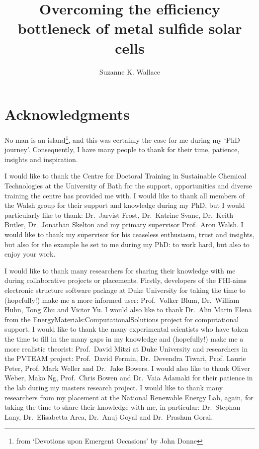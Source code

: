 \documentclass[11pt, twoside]{report}
\title{Overcoming the efficiency bottleneck of metal sulfide solar cells}
\author{Suzanne K. Wallace}
\begin{document}
\maketitle
%

\section*{Acknowledgments}
No man is an island\footnote{from `Devotions upon Emergent Occasions' by John Donne}, and this was certainly the case for me during my `PhD journey'. Consequently, I have many people to thank for their time, patience, insights and inspiration. 

I would like to thank the Centre for Doctoral Training in Sustainable Chemical Technologies at the University of Bath for the support, opportunities and diverse training the centre has provided me with. I would like to thank all members of the Walsh group for their support and knowledge during my PhD, but I would particularly like to thank: Dr.~Jarvist Frost, Dr.~Katrine Svane, Dr.~Keith Butler, Dr.~Jonathan Skelton and my primary supervisor Prof.~Aron Walsh. I would like to thank my supervisor for his ceaseless enthusiasm, trust and insights, but also for the example he set to me during my PhD: to work hard, but also to enjoy your work.

I would like to thank many researchers for sharing their knowledge with me during collaborative projects or placements. Firstly, developers of the FHI-aims electronic structure software package at Duke University for taking the time to (hopefully!) make me a more informed user: Prof.~Volker Blum, Dr.~William Huhn, Tong Zhu and Victor Yu. I would also like to thank Dr.~Alin Marin Elena from the EnergyMaterials:ComputationalSolutions project for computational support. I would like to thank the many experimental scientists who have taken the time to fill in the many gaps in my knowledge and (hopefully!) make me a more realistic theorist: Prof.~David Mitzi at Duke University and researchers in the PVTEAM project: Prof.~David Fermin, Dr.~Devendra Tiwari, Prof. Laurie Peter, Prof. Mark Weller and Dr.~Jake Bowers. 
I would also like to thank Oliver Weber, Mako Ng, Prof.~Chris Bowen and Dr.~Vaia Adamaki for their patience in the lab during my masters research project.
I would like to thank many researchers from my placement at the National Renewable Energy Lab, again, for taking the time to share their knowledge with me, in particular: Dr.~Stephan Lany, Dr.~Elisabetta Arca, Dr.~Anuj Goyal and Dr.~Prashun Gorai. 
\end{document}
